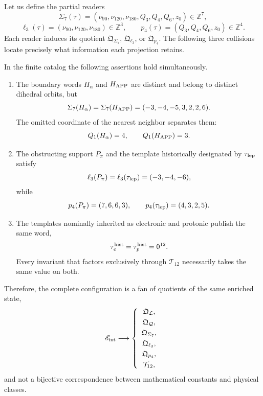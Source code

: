 Let us define the partial readers
\[
 \Sigma_7(\tau)=
 (\nu_{90},\nu_{120},\nu_{180},Q_3,Q_4,Q_6,z_0)
 \in\mathbb Z^7,
\]
\[
 \ell_3(\tau)=(\nu_{90},\nu_{120},\nu_{180})\in\mathbb Z^3,
 \qquad
 p_4(\tau)=(Q_3,Q_4,Q_6,z_0)\in\mathbb Z^4.
\]
Each reader induces its quotient \(\mathfrak Q_{\Sigma_7}\),
\(\mathfrak Q_{\ell_3}\), or \(\mathfrak Q_{p_4}\). The following three collisions
locate precisely what information each projection retains.

\begin{theorem}
\label{thm:configuracion-cocientes-conjugados-rev11}
In the finite catalog the following assertions hold simultaneously.
\begin{enumerate}[label=\textup{(\roman*)},leftmargin=2.2em]
 \item The boundary words \(H_\alpha\) and \(H_{\rm APP}\) are distinct
 and belong to distinct dihedral orbits, but
 \[
  \Sigma_7(H_\alpha)=\Sigma_7(H_{\rm APP})
  =(-3,-4,-5,3,2,2,6).
 \]
 The omitted coordinate of the nearest neighbor separates them:
 \[
  Q_1(H_\alpha)=4,
  \qquad Q_1(H_{\rm APP})=3.
 \]

 \item The obstructing support \(P_\pi\) and the template historically
 designated by \(\tau_{\rm lep}\) satisfy
 \[
  \ell_3(P_\pi)=\ell_3(\tau_{\rm lep})=(-3,-4,-6),
 \]
 while
 \[
  p_4(P_\pi)=(7,6,6,3),
  \qquad p_4(\tau_{\rm lep})=(4,3,2,5).
 \]

 \item The templates nominally inherited as electronic and protonic
 publish the same word,
 \[
  \tau_e^{\rm hist}=\tau_p^{\rm hist}=0^{12}.
 \]
 Every invariant that factors exclusively through
 \(\mathcal T_{12}\) necessarily takes the same value on both.
\end{enumerate}
Therefore, the complete configuration is a fan of quotients of the same
enriched state,
\begin{equation}
 \mathscr E_{\rm int}
 \longrightarrow
 \left\{
 \begin{array}{c}
  \mathfrak Q_{\mathcal L},\\[1mm]
  \mathfrak Q_{\mathcal Q},\\[1mm]
  \mathfrak Q_{\Sigma_7},\\[1mm]
  \mathfrak Q_{\ell_3},\\[1mm]
  \mathfrak Q_{p_4},\\[1mm]
  \mathcal T_{12},
 \end{array}
 \right.
 \label{eq:abanico-cocientes-rev11}
\end{equation}
and not a bijective correspondence between mathematical constants and physical classes.
\end{theorem}

